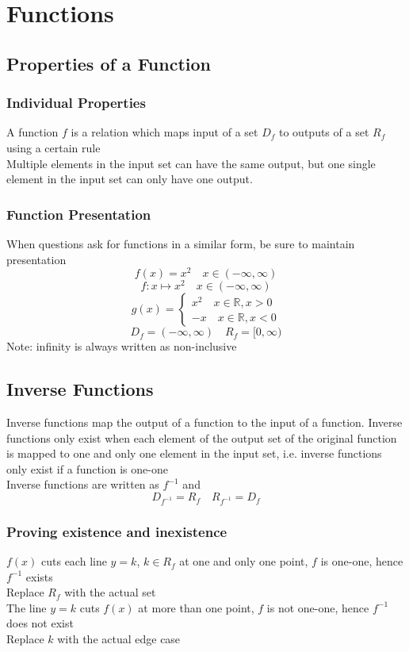 \documentclass[../main]{subfiles}
\begin{document}
\section{Functions}

\subsection{Properties of a Function}

	\subsubsection{Individual Properties}
	A function \(f\) is a relation which maps input of a set \(D_f\) to outputs of a set \(R_f\) using a certain rule \\
	Multiple elements in the input set can have the same output, but one single element in the input set can only have one output.
	\subsubsection{Function Presentation}
	When questions ask for functions in a similar form, be sure to maintain presentation
	\[ f(x) = x^2 \quad x \in (-\infty,\infty) \]
	\[ f: x \mapsto x^2 \quad x \in (-\infty,\infty) \]
	\begin{equation*}
		g(x)=\begin{cases}
			x^2 \quad x\in\mathbb{R}, x>0 \\
			-x \quad x\in\mathbb{R}, x<0
		\end{cases}
	\end{equation*}
	\[ D_f = (-\infty,\infty) \quad R_f = [0,\infty) \]
	Note: infinity is always written as non-inclusive

\subsection{Inverse Functions}
	Inverse functions map the output of a function to the input of a function. Inverse functions only exist when each element of the output set of the original function is mapped to one and only one element in the input set, i.e. inverse functions only exist if a function is one-one \\ 
	Inverse functions are written as \(f^{-1}\) and 
	\[ D_{f^{-1}} = R_f \quad R_{f^{-1}} = D_f \]
	\subsubsection{Proving existence and inexistence}
	\(f(x)\) cuts each line \(y=k\), \(k\in R_f\) at one and only one point, \(f\) is one-one, hence \(f^{-1}\) exists \\
	Replace \(R_f\) with the actual set \\
	The line \(y=k\) cuts \(f(x)\) at more than one point, \(f\) is not one-one, hence \(f^{-1}\) does not exist \\
	Replace \(k\) with the actual edge case
\end{document}
